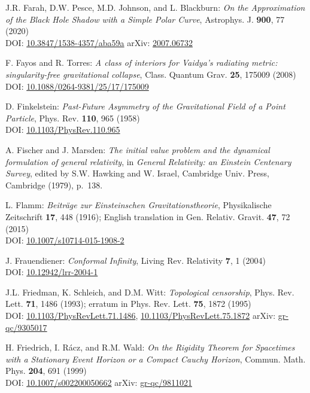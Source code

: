 \begin{thebibliography}{123}
J.R. Farah, D.W. Pesce, M.D. Johnson, and L. Blackburn:
{\em On the Approximation of the Black Hole Shadow with a Simple Polar Curve},
Astrophys. J. {\bf 900}, 77 (2020)\\
DOI: \href{https://doi.org/10.3847/1538-4357/aba59a}{10.3847/1538-4357/aba59a}\hfill
arXiv: \href{https://arxiv.org/abs/2007.06732}{2007.06732}

F. Fayos and R. Torres:
{\em A class of interiors for Vaidya's radiating metric: singularity-free gravitational collapse},
Class. Quantum Grav. {\bf 25}, 175009 (2008)\\
DOI: \href{https://doi.org/10.1088/0264-9381/25/17/175009}{10.1088/0264-9381/25/17/175009}

D. Finkelstein:
{\em Past-Future Asymmetry of the Gravitational Field of a Point Particle},
Phys. Rev. {\bf 110}, 965 (1958)\\
DOI: \href{https://doi.org/10.1103/PhysRev.110.965}{10.1103/PhysRev.110.965}

A. Fischer and J. Marsden:
{\em The initial value problem and the dynamical formulation of general relativity},
in {\em General Relativity: an Einstein
Centenary Survey}, edited by S.W. Hawking and W. Israel,
Cambridge Univ. Press, Cambridge (1979), p.~138.

L. Flamm: {\em Beiträge zur Einsteinschen Gravitationstheorie},
Physikalische Zeitschrift {\bf 17}, 448 (1916); English translation in
Gen. Relativ. Gravit. {\bf 47}, 72 (2015)\\
DOI: \href{https://doi.org/10.1007/s10714-015-1908-2}{10.1007/s10714-015-1908-2}

J. Frauendiener:
{\em Conformal Infinity},
Living Rev. Relativity {\bf 7}, 1 (2004) \\
DOI: \href{https://doi.org/10.12942/lrr-2004-1}{10.12942/lrr-2004-1}

J.L. Friedman, K. Schleich, and D.M. Witt:
{\em Topological censorship},
Phys. Rev. Lett. {\bf 71}, 1486 (1993); erratum in Phys. Rev. Lett. {\bf 75}, 1872 (1995)\\
DOI: \href{https://doi.org/10.1103/PhysRevLett.71.1486}{10.1103/PhysRevLett.71.1486},
\href{https://doi.org/10.1103/PhysRevLett.75.1872}{10.1103/PhysRevLett.75.1872}\hfill
arXiv: \href{https://arxiv.org/abs/gr-qc/9305017}{gr-qc/9305017}

H. Friedrich, I. Rácz, and R.M. Wald:
{\em On the Rigidity Theorem for Spacetimes with a Stationary Event Horizon or a Compact Cauchy Horizon},
Commun. Math. Phys. {\bf 204}, 691 (1999)\\
DOI: \href{https://doi.org/10.1007/s002200050662}{10.1007/s002200050662}\hfill
arXiv: \href{https://arxiv.org/abs/gr-qc/9811021}{gr-qc/9811021}


\end{thebibliography}
